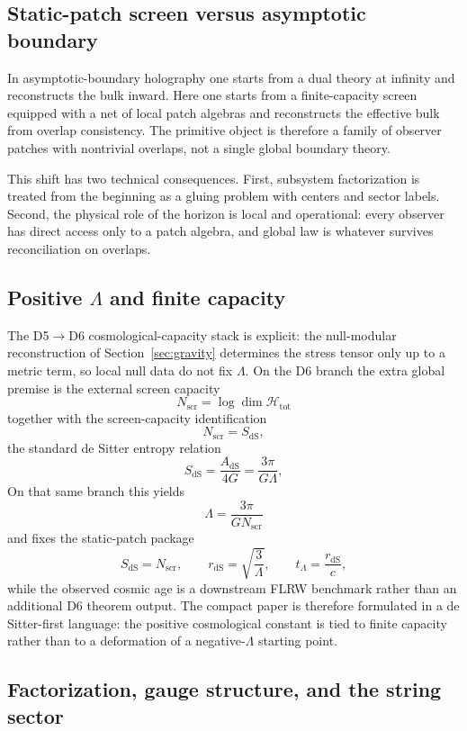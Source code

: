 \documentclass[11pt]{article}
\begin{document}
\subsection{Static-patch screen versus asymptotic boundary}

In asymptotic-boundary holography one starts from a dual theory at infinity and reconstructs the bulk inward. Here one starts from a finite-capacity screen equipped with a net of local patch algebras and reconstructs the effective bulk from overlap consistency. The primitive object is therefore a family of observer patches with nontrivial overlaps, not a single global boundary theory.

This shift has two technical consequences. First, subsystem factorization is treated from the beginning as a gluing problem with centers and sector labels. Second, the physical role of the horizon is local and operational: every observer has direct access only to a patch algebra, and global law is whatever survives reconciliation on overlaps.

\subsection{Positive $\Lambda$ and finite capacity}

The D5\(\to\)D6 cosmological-capacity stack is explicit: the null-modular reconstruction of Section~\ref{sec:gravity} determines the stress tensor only up to a metric term, so local null data do not fix $\Lambda$. On the D6 branch the extra global premise is the external screen capacity
\[
N_{\mathrm{scr}}=\log\dim\mathcal H_{\mathrm{tot}}
\]
together with the screen-capacity identification
\[
N_{\mathrm{scr}}=S_{\mathrm{dS}},
\]
\noindent the standard de Sitter entropy relation
\[
S_{\mathrm{dS}}=\frac{A_{\mathrm{dS}}}{4G}=\frac{3\pi}{G\Lambda},
\]
On that same branch this yields
\[
\Lambda=\frac{3\pi}{G N_{\mathrm{scr}}}
\]
and fixes the static-patch package
\[
S_{\mathrm{dS}}=N_{\mathrm{scr}},
\qquad
r_{\mathrm{dS}}=\sqrt{\frac{3}{\Lambda}},
\qquad
t_\Lambda=\frac{r_{\mathrm{dS}}}{c},
\]
while the observed cosmic age is a downstream FLRW benchmark rather than an additional D6 theorem output. The compact paper is therefore formulated in a de Sitter-first language: the positive cosmological constant is tied to finite capacity rather than to a deformation of a negative-$\Lambda$ starting point.

\subsection{Factorization, gauge structure, and the string sector}
\end{document}
